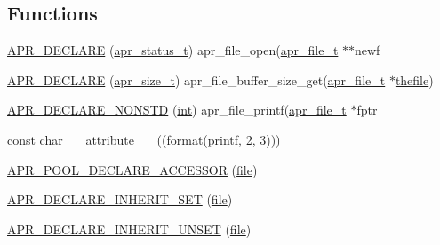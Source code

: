 \subsection*{Functions}
\begin{DoxyCompactItemize}
\item 
\hyperlink{group__apr__file__io_ga6a59a988c3f3d792e2dd9e923f4f0bc4}{A\+P\+R\+\_\+\+D\+E\+C\+L\+A\+RE} (\hyperlink{group__apr__errno_gaa5105fa83cc322f09382292db8b47593}{apr\+\_\+status\+\_\+t}) apr\+\_\+file\+\_\+open(\hyperlink{structapr__file__t}{apr\+\_\+file\+\_\+t} $\ast$$\ast$newf
\item 
\hyperlink{group__apr__file__io_gad950dd5773690685ffed1e4a02ccdefa}{A\+P\+R\+\_\+\+D\+E\+C\+L\+A\+RE} (\hyperlink{group__apr__platform_gaaa72b2253f6f3032cefea5712a27540e}{apr\+\_\+size\+\_\+t}) apr\+\_\+file\+\_\+buffer\+\_\+size\+\_\+get(\hyperlink{structapr__file__t}{apr\+\_\+file\+\_\+t} $\ast$\hyperlink{group__apr__portabile_ga8dd020a355482f70199dcdcd65464a75}{thefile})
\item 
\hyperlink{group__apr__file__io_ga3c5a0f7acf9fc63278e0d50eaa916d2c}{A\+P\+R\+\_\+\+D\+E\+C\+L\+A\+R\+E\+\_\+\+N\+O\+N\+S\+TD} (\hyperlink{pcre_8txt_a42dfa4ff673c82d8efe7144098fbc198}{int}) apr\+\_\+file\+\_\+printf(\hyperlink{structapr__file__t}{apr\+\_\+file\+\_\+t} $\ast$fptr
\item 
const char \hyperlink{group__apr__file__io_ga44bb214856b287cad23bb7a57bbdd7ac}{\+\_\+\+\_\+attribute\+\_\+\+\_\+} ((\hyperlink{group__apr__time_ga6427c3237144d9709aa13825289f0b78}{format}(printf, 2, 3)))
\item 
\hyperlink{group__apr__file__io_gaeceb47cbc35ab63c76677b75f6ab6ce5}{A\+P\+R\+\_\+\+P\+O\+O\+L\+\_\+\+D\+E\+C\+L\+A\+R\+E\+\_\+\+A\+C\+C\+E\+S\+S\+OR} (\hyperlink{pcregrep_8txt_ac062b5382a17ef4e936c49bdd74c5563}{file})
\item 
\hyperlink{group__apr__file__io_ga5667f89b302ab25b3826408e2b8f0cb2}{A\+P\+R\+\_\+\+D\+E\+C\+L\+A\+R\+E\+\_\+\+I\+N\+H\+E\+R\+I\+T\+\_\+\+S\+ET} (\hyperlink{pcregrep_8txt_ac062b5382a17ef4e936c49bdd74c5563}{file})
\item 
\hyperlink{group__apr__file__io_ga42827bfed9a99a3ae9eebe52d11c3193}{A\+P\+R\+\_\+\+D\+E\+C\+L\+A\+R\+E\+\_\+\+I\+N\+H\+E\+R\+I\+T\+\_\+\+U\+N\+S\+ET} (\hyperlink{pcregrep_8txt_ac062b5382a17ef4e936c49bdd74c5563}{file})
\end{DoxyCompactItemize}

